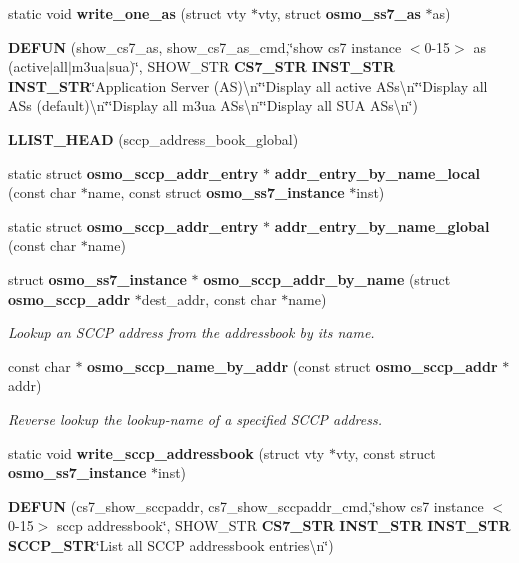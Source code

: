 \begin{DoxyCompactItemize}
\item 
static void {\bf write\+\_\+one\+\_\+as} (struct vty $\ast$vty, struct {\bf osmo\+\_\+ss7\+\_\+as} $\ast$as)
\item 
{\bf D\+E\+F\+UN} (show\+\_\+cs7\+\_\+as, show\+\_\+cs7\+\_\+as\+\_\+cmd,\char`\"{}show cs7 instance $<$0-\/15$>$ as (active$\vert$all$\vert$m3ua$\vert$sua)\char`\"{}, S\+H\+O\+W\+\_\+\+S\+TR {\bf C\+S7\+\_\+\+S\+TR} {\bf I\+N\+S\+T\+\_\+\+S\+TR} {\bf I\+N\+S\+T\+\_\+\+S\+TR}\char`\"{}Application Server (AS)\textbackslash{}n\char`\"{}\char`\"{}Display all active A\+Ss\textbackslash{}n\char`\"{}\char`\"{}Display all A\+Ss (default)\textbackslash{}n\char`\"{}\char`\"{}Display all m3ua A\+Ss\textbackslash{}n\char`\"{}\char`\"{}Display all S\+UA A\+Ss\textbackslash{}n\char`\"{})
\item 
{\bf L\+L\+I\+S\+T\+\_\+\+H\+E\+AD} (sccp\+\_\+address\+\_\+book\+\_\+global)
\item 
static struct {\bf osmo\+\_\+sccp\+\_\+addr\+\_\+entry} $\ast$ {\bf addr\+\_\+entry\+\_\+by\+\_\+name\+\_\+local} (const char $\ast$name, const struct {\bf osmo\+\_\+ss7\+\_\+instance} $\ast$inst)
\item 
static struct {\bf osmo\+\_\+sccp\+\_\+addr\+\_\+entry} $\ast$ {\bf addr\+\_\+entry\+\_\+by\+\_\+name\+\_\+global} (const char $\ast$name)
\item 
struct {\bf osmo\+\_\+ss7\+\_\+instance} $\ast$ {\bf osmo\+\_\+sccp\+\_\+addr\+\_\+by\+\_\+name} (struct {\bf osmo\+\_\+sccp\+\_\+addr} $\ast$dest\+\_\+addr, const char $\ast$name)
\begin{DoxyCompactList}\small\item\em Lookup an S\+C\+CP address from the addressbook by its name. \end{DoxyCompactList}\item 
const char $\ast$ {\bf osmo\+\_\+sccp\+\_\+name\+\_\+by\+\_\+addr} (const struct {\bf osmo\+\_\+sccp\+\_\+addr} $\ast$addr)
\begin{DoxyCompactList}\small\item\em Reverse lookup the lookup-\/name of a specified S\+C\+CP address. \end{DoxyCompactList}\item 
static void {\bf write\+\_\+sccp\+\_\+addressbook} (struct vty $\ast$vty, const struct {\bf osmo\+\_\+ss7\+\_\+instance} $\ast$inst)
\item 
{\bf D\+E\+F\+UN} (cs7\+\_\+show\+\_\+sccpaddr, cs7\+\_\+show\+\_\+sccpaddr\+\_\+cmd,\char`\"{}show cs7 instance $<$0-\/15$>$ sccp addressbook\char`\"{}, S\+H\+O\+W\+\_\+\+S\+TR {\bf C\+S7\+\_\+\+S\+TR} {\bf I\+N\+S\+T\+\_\+\+S\+TR} {\bf I\+N\+S\+T\+\_\+\+S\+TR} {\bf S\+C\+C\+P\+\_\+\+S\+TR}\char`\"{}List all S\+C\+CP addressbook entries\textbackslash{}n\char`\"{})

\end{DoxyCompactItemize}
